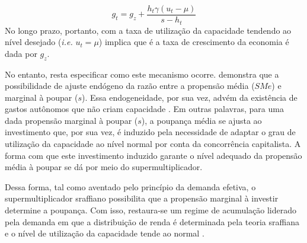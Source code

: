 \begin{equation}
g_t = g_z + \frac{h_t\gamma(u_t-\mu)}{s-h_t}
\label{SSM_g}
\end{equation}
No longo prazo, portanto, com a taxa de utilização da capacidade tendendo ao nível desejado (\textit{i.e.} $u_t = \mu$) implica que é a taxa de crescimento da economia é dada por $g_z$.

No entanto, resta especificar como este mecanismo ocorre. \textcite{serrano_sraffian_1995} demonstra que a possibilidade de ajuste endógeno da razão entre a propensão média ($S{Me}$)  e marginal à poupar ($s$). Essa endogeneidade, por sua vez, advém da existência de gastos autônomos que não criam capacidade \cite{serrano_sraffian_2017}. 
Em outras palavras, para uma dada propensão marginal à poupar ($s$), a poupança média se ajusta ao investimento que, por sua vez, é induzido pela necessidade de adaptar o grau de utilização da capacidade ao nível normal por conta da concorrência capitalista.  A forma com que este investimento induzido garante o nível adequado da propensão média à poupar se dá por meio do supermultiplicador. 

Dessa forma, tal como aventado pelo princípio da demanda efetiva, o supermultiplicador sraffiano possibilita que a propensão marginal à investir determine a poupança.
Com isso, restaura-se um regime de acumulação liderado pela demanda em que a distribuição de renda é determinada pela teoria sraffiana e o nível de utilização da capacidade tende ao normal \cite{nikiforos_comments_2018}. 

